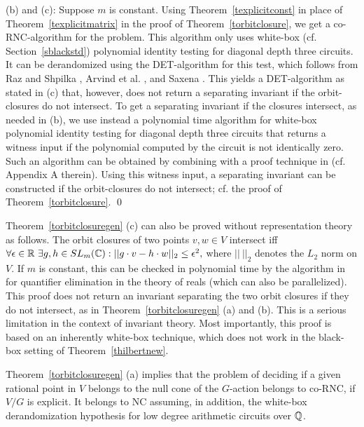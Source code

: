\documentclass[11pt]{article}
\begin{document}
\noindent (b) and (c): Suppose $m$ is constant. Using Theorem~\ref{texplicitconst}
in place of Theorem~\ref{texplicitmatrix} in the proof of Theorem~\ref{torbitclosure}, we get a co-RNC-algorithm 
for the problem. This algorithm only uses white-box (cf. Section~\ref{sblackstd})
polynomial identity testing for diagonal depth three circuits.
It can be derandomized using 
the DET-algorithm for this test, which  follows from
Raz and Shpilka \cite{raz},  Arvind et al. \cite{arvind}, and Saxena \cite{saxena}. 
This yields  a DET-algorithm as stated in (c) that, however,   does not 
return a separating invariant if the orbit-closures do not intersect.
To get a separating invariant if the closures intersect, as needed
in (b), we use instead a polynomial time algorithm for 
white-box polynomial identity testing for diagonal depth three circuits
that returns a witness input  
if the polynomial computed by the circuit is not identically zero. Such an algorithm can be   obtained by combining
\cite{raz,arvind,saxena} with a proof technique in \cite{manindra} (cf. Appendix A
therein). Using this witness input, a separating invariant can be  constructed if the orbit-closures
do not intersect; cf. the proof of Theorem~\ref{torbitclosure}. 
\qed 

Theorem~\ref{torbitclosuregen} (c)
can also be proved without representation theory as follows.
The orbit closures of two points $v,w \in V$ intersect iff 
$\forall \epsilon \in \R \ \exists g,h \in SL_m(\C): ||g\cdot v - h \cdot w||_2 \le \epsilon^2,$ where $||\ ||_2$ denotes the $L_2$ norm on $V$. 
If $m$ is constant, this can be checked  in  polynomial time 
by the algorithm in \cite{basu} for quantifier elimination in the theory of reals (which can also be parallelized). 
This proof  does not 
return an invariant separating the two orbit closures if they do not intersect, as in 
Theorem~\ref{torbitclosuregen} (a) and (b).
This  is a serious limitation in the context of invariant theory.
Most importantly,  this proof  is based on an inherently white-box
technique, which does not work in the black-box setting of Theorem~\ref{thilbertnew}.



 Theorem~\ref{torbitclosuregen} (a) implies that
the problem of deciding if a given rational point in $V$ belongs to the null cone \cite{mumford} 
of the $G$-action
belongs to co-RNC, if $V/G$ is explicit. It belongs to NC assuming, in addition, the white-box derandomization 
hypothesis for low degree arithmetic circuits over $\mathbb{Q}$.
\end{document}
